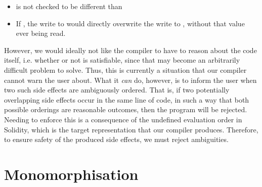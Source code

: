 \begin{itemize}
  \item {} is not checked to be different than 
  \item If , the write to  would directly overwrite the write to , without that value ever being read.
\end{itemize}
However, we would ideally not like the compiler to have to reason about the code itself, i.e. whether or not  is satisfiable, since that may become an arbitrarily difficult problem to solve. Thus, this is currently a situation that our compiler cannot warn the user about. What it \textit{can} do, however, is to inform the user when two such side effects are ambiguously ordered. That is, if two potentially overlapping side effects occur in the same line of code, in such a way that both possible orderings are reasonable outcomes, then the program will be rejected. Needing to enforce this is a consequence of the undefined evaluation order in Solidity, which is the target representation that our compiler produces. Therefore, to ensure safety of the produced side effects, we must reject ambiguities.

\section{Monomorphisation}

